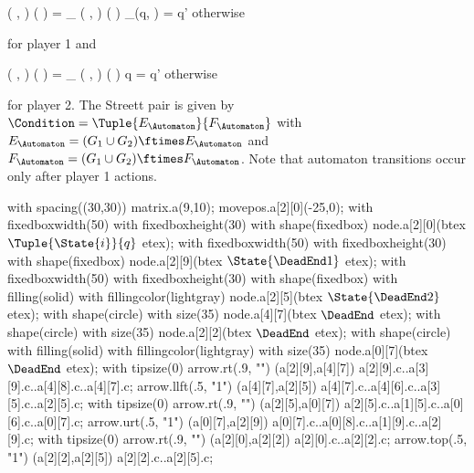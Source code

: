     \startformula
        \Transition
            \Big( ,  \Big)
            \Big(  \Big)
        = \startmathcases
            \NC \Transition_\GameGraph
            \Big( ,  \Big)
            \Big(  \Big)
            \MC \StartIf \Transition_\Automaton(q, ) = q'
            \NR
            \NC otherwise
            \NR
        \stopmathcases
    \stopformula

    for player 1 and

    \startformula
        \Transition
            \Big( ,  \Big)
            \Big(  \Big)
        = \startmathcases
            \NC \Transition_\GameGraph
            \Big( ,  \Big)
            \Big(  \Big)
            \MC \StartIf q = q'
            \NR
            \NC otherwise
            \NR
        \stopmathcases
    \stopformula

    for player 2.
    The Streett pair is given by $\Condition = \Tuple{E_\Automaton}{F_\Automaton}$ with $E_\Automaton = (G_1 \cup G_2) \ftimes E_\Automaton$ and $F_\Automaton = (G_1 \cup G_2) \ftimes F_\Automaton$.
    Note that automaton transitions occur only after player 1 actions.

\stopsubsection


    with spacing((30,30)) matrix.a(9,10);
    movepos.a[2][0](-25,0);
    with fixedboxwidth(50) with fixedboxheight(30) with shape(fixedbox) node.a[2][0](btex $\Tuple{\State{i}}{q}$ etex);
    with fixedboxwidth(50) with fixedboxheight(30) with shape(fixedbox) node.a[2][9](btex $\State{\DeadEnd1}$ etex);
    with fixedboxwidth(50) with fixedboxheight(30) with shape(fixedbox) with filling(solid) with fillingcolor(lightgray) node.a[2][5](btex $\State{\DeadEnd2}$ etex);
    with shape(circle) with size(35) node.a[4][7](btex \ssd $\DeadEnd$ etex);
    with shape(circle) with size(35) node.a[2][2](btex \ssd $\DeadEnd$ etex);
    with shape(circle) with filling(solid) with fillingcolor(lightgray) with size(35) node.a[0][7](btex \ssd $\DeadEnd$ etex);
    with tipsize(0) arrow.rt(.9, "") (a[2][9],a[4][7]) a[2][9].c..a[3][9].c..a[4][8].c..a[4][7].c;
    arrow.llft(.5, "1") (a[4][7],a[2][5]) a[4][7].c..a[4][6].c..a[3][5].c..a[2][5].c;
    with tipsize(0) arrow.rt(.9, "") (a[2][5],a[0][7]) a[2][5].c..a[1][5].c..a[0][6].c..a[0][7].c;
    arrow.urt(.5, "1") (a[0][7],a[2][9]) a[0][7].c..a[0][8].c..a[1][9].c..a[2][9].c;
    with tipsize(0) arrow.rt(.9, "") (a[2][0],a[2][2]) a[2][0].c..a[2][2].c;
    arrow.top(.5, "1") (a[2][2],a[2][5]) a[2][2].c..a[2][5].c;
\stopreusableMPgraphic

